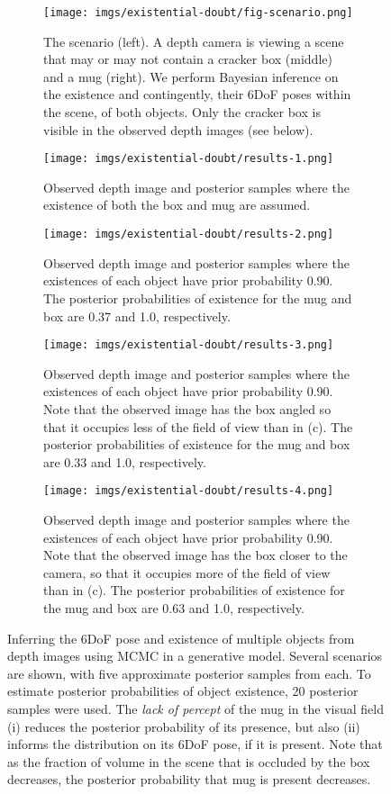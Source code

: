 \begin{figure}[p]
\begin{subfigure}[t]{1\textwidth}
    \centering
    \texttt{[image: imgs/existential-doubt/fig-scenario.png]}
    \caption{The scenario (left). A depth camera is viewing a scene that may or may not contain a cracker box (middle) and a mug (right). We perform Bayesian inference on the existence and contingently, their 6DoF poses within the scene, of both objects. Only the cracker box is visible in the observed depth images (see below).}
    \label{fig:scenario}
\end{subfigure}
\begin{subfigure}[t]{\textwidth}
    \centering
    \texttt{[image: imgs/existential-doubt/results-1.png]}
    \caption{Observed depth image and posterior samples where the existence of both the box and mug are assumed.}
    \label{fig:results-1}
\end{subfigure}
\begin{subfigure}[t]{\textwidth}
    \centering
    \texttt{[image: imgs/existential-doubt/results-2.png]}
    \caption{Observed depth image and posterior samples where the existences of each object have prior probability 0.90.
The posterior probabilities of existence for the mug and box are 0.37 and 1.0, respectively.}
    \label{fig:results-2}
\end{subfigure}
\begin{subfigure}[t]{\textwidth}
    \centering
    \texttt{[image: imgs/existential-doubt/results-3.png]}
    \caption{Observed depth image and posterior samples where the existences of each object have prior probability 0.90.
Note that the observed image has the box angled so that it occupies less of the field of view than in (c).
The posterior probabilities of existence for the mug and box are 0.33 and 1.0, respectively.}
    \label{fig:results-3}
\end{subfigure}
\begin{subfigure}[t]{\textwidth}
    \centering
    \texttt{[image: imgs/existential-doubt/results-4.png]}
    \caption{Observed depth image and posterior samples where the existences of each object have prior probability 0.90.
Note that the observed image has the box closer to the camera, so that it occupies more of the field of view than in (c). 
The posterior probabilities of existence for the mug and box are 0.63 and 1.0, respectively.}
    \label{fig:results-4}
\end{subfigure}%
    \caption{
Inferring the 6DoF pose and existence of multiple objects from depth images using MCMC in a generative model.
Several scenarios are shown, with five approximate posterior samples from each.
To estimate posterior probabilities of object existence, 20 posterior samples were used.
The \emph{lack of percept} of the mug in the visual field (i) reduces the posterior probability of its presence, but also (ii) informs the distribution on its 6DoF pose, if it is present.
Note that as the fraction of volume in the scene that is occluded by the box decreases, the posterior probability that mug is present decreases.
}
    \label{fig:results}
\end{figure}

